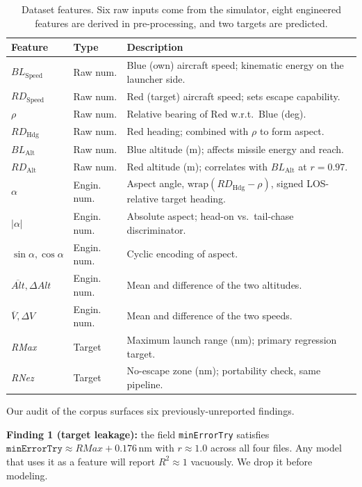\documentclass[conference]{IEEEtran}
\begin{document}
\begin{table}[t]
\centering
\caption{Dataset features. Six raw inputs come from the simulator, eight engineered features are derived in pre-processing, and two targets are predicted.}
\label{tab:features}
\scriptsize
\setlength{\tabcolsep}{3pt}
\renewcommand{\arraystretch}{1.05}
\begin{tabular}{p{1.7cm}p{1.0cm}p{4.6cm}}
\toprule
Feature & Type & Description \\
\midrule
$BL_{\text{Speed}}$ & Raw num. & Blue (own) aircraft speed; kinematic energy on the launcher side. \\
$RD_{\text{Speed}}$ & Raw num. & Red (target) aircraft speed; sets escape capability. \\
$\rho$              & Raw num. & Relative bearing of Red w.r.t.\ Blue (deg). \\
$RD_{\text{Hdg}}$   & Raw num. & Red heading; combined with $\rho$ to form aspect. \\
$BL_{\text{Alt}}$   & Raw num. & Blue altitude (m); affects missile energy and reach. \\
$RD_{\text{Alt}}$   & Raw num. & Red altitude (m); correlates with $BL_{\text{Alt}}$ at $r{=}0.97$. \\
$\alpha$            & Engin. num. & Aspect angle, $\mathrm{wrap}(RD_{\text{Hdg}} - \rho)$, signed LOS-relative target heading. \\
$|\alpha|$          & Engin. num. & Absolute aspect; head-on vs.\ tail-chase discriminator. \\
$\sin\alpha,\cos\alpha$ & Engin. num. & Cyclic encoding of aspect. \\
$\overline{Alt},\Delta Alt$ & Engin. num. & Mean and difference of the two altitudes. \\
$\overline{V},\Delta V$ & Engin. num. & Mean and difference of the two speeds. \\
\textit{RMax}       & Target  & Maximum launch range (nm); primary regression target. \\
\textit{RNez}       & Target  & No-escape zone (nm); portability check, same pipeline. \\
\bottomrule
\end{tabular}
\end{table}

Our audit of the corpus surfaces six previously-unreported findings.

\textbf{Finding 1 (target leakage):} the field \texttt{minErrorTry} satisfies $\texttt{minErrorTry}\approx\textit{RMax}+0.176$\,nm with $r\approx 1.0$ across all four files. Any model that uses it as a feature will report $R^2\approx 1$ vacuously. We drop it before modeling.
\end{document}
